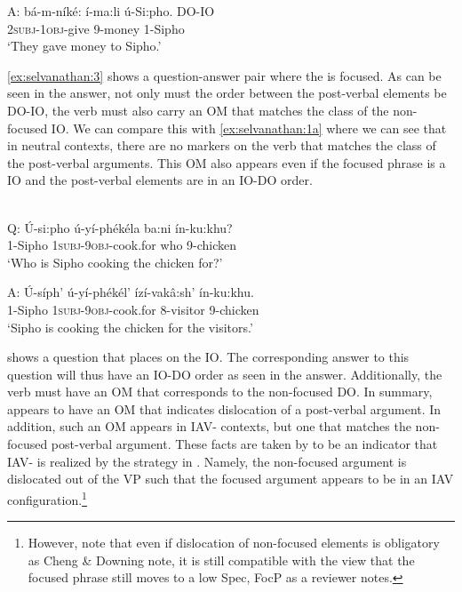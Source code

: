 \documentclass[output=paper
,newtxmath
,modfonts
,nonflat]{langsci/langscibook}
\begin{document}
A: \gll bá-m-níké:      í-ma:li   ú-Si:pho.     DO-IO\\
\textsc{2subj}{}-\textsc{1obj}{}-give   9-money   1-Sipho\\
\glt    \-\hspace{0.5cm}`They gave money to Sipho.’ 
\z

\ref{ex:selvanathan:3} shows a question-answer pair where the  is focused. As can be seen in the answer, not only must the order between the post-verbal elements be DO-IO, the verb must also carry an OM that matches the class of the non-focused IO. We can compare this with \ref{ex:selvanathan:1a} where we can see that in neutral contexts, there are no markers on the verb that matches the class of the post-verbal arguments. This OM also appears even if the focused phrase is a IO and the post-verbal elements are in an IO-DO order. 

\ea\label{ex:selvanathan:4}
 \citep[4]{chengdowning2012}\\
Q: \gll  Ú-si:pho    ú-yí-phékéla        ba:ni   ín-ku:khu?\\
1-Sipho       \textsc{1subj}{}-\textsc{9obj}{}-cook.for  who    9-chicken\\ 
\glt \-\hspace{0.5cm}`Who is Sipho cooking the chicken for?’

A: \gll  Ú-síph’   ú-yí-phékél’              ízí-vakâ:sh’    ín-ku:khu.\\
	1-Sipho  \textsc{1subj}{}-\textsc{9obj}{}-cook.for    8-visitor    9-chicken\\
\glt \-\hspace{0.5cm}`Sipho is cooking the chicken for the visitors.’
\z

 shows a question that places  on the IO. The corresponding answer to this question will thus have an IO-DO order as seen in the answer. Additionally, the verb must have an OM that corresponds to the non-focused DO. In summary,  appears to have an OM that indicates dislocation of a post-verbal argument. In addition, such an OM appears in IAV- contexts, but one that matches the non-focused post-verbal argument. These facts are taken by \citet{chengdowning2012} to be an indicator that  IAV- is realized by the strategy in . Namely, the non-focused argument is dislocated out of the VP such that the focused argument appears to be in an IAV configuration.\footnote{However, note that even if dislocation of non-focused elements is obligatory as Cheng \& Downing note, it is still compatible with the view that the focused phrase still moves to a low Spec, FocP as a reviewer notes.} 
\end{document}
